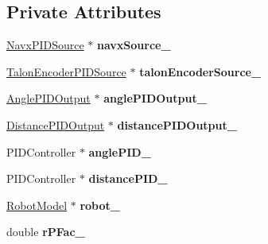 \subsection*{Private Attributes}
\begin{DoxyCompactItemize}
\item 
\mbox{\label{class_drive_straight_command_aa19044f8470773a0a78d436e76793e85}} 
\hyperlink{class_navx_p_i_d_source}{Navx\+P\+I\+D\+Source} $\ast$ {\bfseries navx\+Source\+\_\+}
\item 
\mbox{\label{class_drive_straight_command_a5bcabefc32269e4e1e8a9b615ae4c858}} 
\hyperlink{class_talon_encoder_p_i_d_source}{Talon\+Encoder\+P\+I\+D\+Source} $\ast$ {\bfseries talon\+Encoder\+Source\+\_\+}
\item 
\mbox{\label{class_drive_straight_command_a4176a77943be202562f5e59fc45bb81b}} 
\hyperlink{class_angle_p_i_d_output}{Angle\+P\+I\+D\+Output} $\ast$ {\bfseries angle\+P\+I\+D\+Output\+\_\+}
\item 
\mbox{\label{class_drive_straight_command_aa1776b5cf77560fb0e10fc8dd8a19384}} 
\hyperlink{class_distance_p_i_d_output}{Distance\+P\+I\+D\+Output} $\ast$ {\bfseries distance\+P\+I\+D\+Output\+\_\+}
\item 
\mbox{\label{class_drive_straight_command_ab0c6603062389523a97b269cf1de0b6d}} 
P\+I\+D\+Controller $\ast$ {\bfseries angle\+P\+I\+D\+\_\+}
\item 
\mbox{\label{class_drive_straight_command_a683760b04b20beaba6d2283474cc9a57}} 
P\+I\+D\+Controller $\ast$ {\bfseries distance\+P\+I\+D\+\_\+}
\item 
\mbox{\label{class_drive_straight_command_ad93fa1271f0fe6eb8b8ebcfff4e8c385}} 
\hyperlink{class_robot_model}{Robot\+Model} $\ast$ {\bfseries robot\+\_\+}
\item 
\mbox{\label{class_drive_straight_command_a00480d21eea8d62373fb4060a005e2e1}} 
double {\bfseries r\+P\+Fac\+\_\+}
\item 

\end{DoxyCompactItemize}
